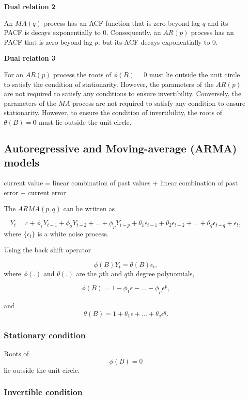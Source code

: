 \documentclass[]{book}
\begin{document}
\textbf{Dual relation 2}

An \(MA(q)\) process has an ACF function that is zero beyond lag \(q\) and its PACF is decays exponentially to 0. Consequently, an \(AR(p)\) process has an PACF that is zero beyond lag-\(p\), but its ACF decays exponentially to 0.

\textbf{Dual relation 3}

For an \(AR(p)\) process the roots of \(\phi(B)=0\) must lie outside the unit circle to satisfy the condition of stationarity. However, the parameters of the \(AR(p)\) are not required to satisfy any conditions to ensure invertibility. Conversely, the parameters of the \(MA\) process are not required to satisfy any condition to ensure stationarity. However, to ensure the condition of invertibility, the roots of \(\theta(B)=0\) must lie outside the unit circle.

\hypertarget{autoregressive-and-moving-average-arma-models}{%
\subsection{Autoregressive and Moving-average (ARMA) models}\label{autoregressive-and-moving-average-arma-models}}

current value = linear combination of past values + linear combination of past error + current error

The \(ARMA(p, q)\) can be written as

\[Y_t=c+\phi_1 Y_{t-1}+\phi_2 Y_{t-2}+...+\phi_p Y_{t-p}+\theta_1\epsilon_{t-1}+\theta_2\epsilon_{t-2}+...+\theta_q\epsilon_{t-q}+\epsilon_t,\]
where \(\{\epsilon_t\}\) is a white noise process.

Using the back shift operator

\[\phi(B)Y_t=\theta(B)\epsilon_t,\]
where \(\phi(.)\) and \(\theta(.)\) are the \(p\)th and \(q\)th degree polynomials,

\[\phi(B)=1-\phi_1 \epsilon -...-\phi_p \epsilon^p,\]

and
\[\theta(B)=1+\theta_1\epsilon+...+\theta_q\epsilon^q.\]

\hypertarget{stationary-condition}{%
\subsubsection{Stationary condition}\label{stationary-condition}}

Roots of \[\phi(B)=0\] lie outside the unit circle.

\hypertarget{invertible-condition}{%
\subsubsection{Invertible condition}\label{invertible-condition}}
\end{document}
